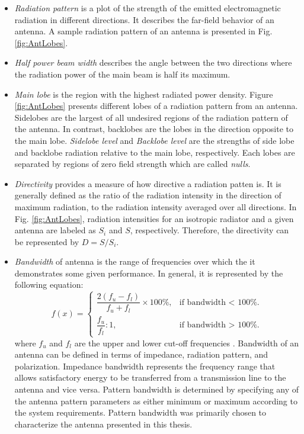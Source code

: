%
\begin{itemize}
\item \textit{Radiation pattern} is a plot of the strength of the emitted electromagnetic radiation in different directions. It describes the far-field behavior of an antenna. A sample radiation pattern of an antenna is presented in Fig. \ref{fig:AntLobes}.
\item  \textit{Half power beam width} describes the angle between the two directions where the radiation power of the main beam is half its maximum.
\item \textit{Main lobe} is the region with the highest radiated power density. Figure \ref{fig:AntLobes} presents different lobes of a radiation pattern from an antenna. Sidelobes are the largest of all undesired regions of the radiation pattern of the antenna. In contrast, backlobes are the lobes in the direction opposite to the main lobe. \textit{Sidelobe level} and \textit{Backlobe level} are the strengths of side lobe and backlobe radiation relative to the main lobe, respectively. Each lobes are separated by regions of zero field strength which are called \textit{nulls}.
\item  \textit{Directivity} provides a measure of how directive a radiation patten is. It is generally defined as the ratio of the radiation intensity in the direction of maximum radiation, to the radiation intensity averaged over all directions. In Fig. \ref{fig:AntLobes}, radiation intensities for an isotropic radiator and a given antenna are labeled as $S_i$ and $S$, respectively. Therefore, the directivity can be represented by $D=S / S_i$.
\item \textit{Bandwidth} of antenna is the range of frequencies over which the it demonstrates some given performance. In general, it is represented by the following equation:
%
\begin{equation}
  f(x)=\begin{cases}
    \dfrac{2(f_u - f_l)}{f_u + f_l} \times 100 \%, & \text{if bandwidth < 100\%}.\\
    \dfrac{f_u}{f_l}:1, & \text{if bandwidth > 100\%}.
  \end{cases}
\end{equation}
%
where $f_u$ and $f_l$ are the upper and lower cut-off frequencies \cite{chen2006}. Bandwidth of an antenna can be defined in terms of impedance, radiation pattern, and polarization. Impedance bandwidth represents the frequency range that allows satisfactory energy to be transferred from a transmission line to the antenna and vice versa. Pattern bandwidth is determined by specifying any of the antenna pattern parameters as either minimum or maximum according to the system requirements. Pattern bandwidth was primarily chosen to characterize the antenna presented in this thesis. 
\end{itemize}

